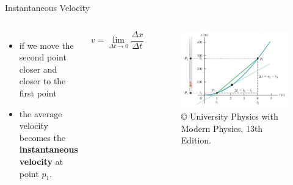 \documentclass[]{beamer}
\begin{document}

\begin{frame}
Instantaneous Velocity
\vspace{3mm}
   \begin{columns}[c]
   \column{2in}  %
  
\begin{itemize}
\item  if we move the second point closer and closer to the first point
\item   the average velocity becomes the \textbf{instantaneous velocity} at point $p_1$.

\end{itemize}

\begin{equation*}
\boxed{v=\lim_{\Delta t\to0} \frac{\Delta x}{\Delta t}}
\end{equation*}


   \column{2.5in}
   
   \begin{figure}[h!]
 
  \includegraphics[width=1.\textwidth]{images/6.jpg}
   \caption{ {\tiny © University Physics 
   with Modern Physics, 13th Edition.} }
\end{figure}

   \end{columns}

 \end{frame}

\end{document}
